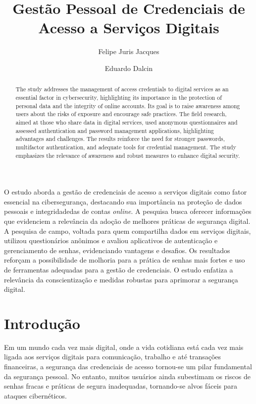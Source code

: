 \documentclass[12pt]{article}
\title{Gestão Pessoal de Credenciais de Acesso a Serviços Digitais}
\author{Felipe Juris Jacques\inst{1} \and Eduardo Dalcin\inst{1} }
\begin{document}
 

\maketitle

\begin{abstract}
  The study addresses the management of access credentials to digital services as an
  essential factor in cybersecurity, highlighting its importance in the protection of
  personal data and the integrity of online accounts.
  Its goal is to raise awareness among users about the risks of exposure and encourage
  safe practices.
  The field research, aimed at those who share data in digital services, used anonymous
  questionnaires and assessed authentication and password management applications,
  highlighting advantages and challenges.
  The results reinforce the need for stronger passwords, multifactor authentication, and
  adequate tools for credential management.
  The study emphasizes the relevance of awareness and robust measures to enhance digital
  security.
\end{abstract}
     
\begin{resumo}
  O estudo aborda a gestão de credenciais de acesso a serviços digitais como fator
  essencial na cibersegurança, destacando sua importância na proteção de dados pessoais
  e integridadedas de contas \textit{online}.
  A pesquisa busca oferecer informações que evidenciem a relevância da adoção de
  melhores práticas de segurança digital.
  A pesquisa de campo, voltada para quem compartilha dados em serviços digitais, utilizou
  questionários anônimos e avaliou aplicativos de autenticação e gerenciamento de
  senhas, evidenciando vantagens e desafios.
  Os resultados reforçam a possibilidade de molhoria para a prática de senhas mais fortes
  e uso de ferramentas adequadas para a gestão de credenciais.
  O estudo enfatiza a relevância da conscientização e medidas robustas para aprimorar
  a segurança digital.
\end{resumo}

\section{Introdução}

Em um mundo cada vez mais digital, onde a vida cotidiana está cada vez mais ligada aos
serviços digitais para comunicação, trabalho e até transações financeiras, a segurança
das credenciais de acesso tornou-se um pilar fundamental da segurança pessoal.
No entanto, muitos usuários ainda subestimam os riscos de senhas fracas e práticas
de segura inadequadas, tornando-se alvos fáceis para ataques cibernéticos.
\end{document}
